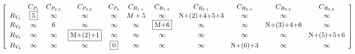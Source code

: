 \begin{figure*}
 \begin{equation*}
\left[ {\begin{array}{*{20}{c}}
&C_{P_{1}}&C_{P_{2.2}}&C_{P_{2.3}}&C_{P_4}&C_{B_{1.1}}&C_{B_{1.2}}&C_{B_{2.1}}&C_{B_{2.4}}&C_{B_{3.2}}&C_{B_{3.3}}\\
R_{V_1}&\fbox{5}&\infty&\infty&\infty&M+5&\infty&${N+(2)+4+5+3}$&\infty&\infty&\infty\\
R_{V_2}&\infty&\mbox{6}&\infty&\infty&\infty&\fbox{M+6}&\infty&\infty&${N+(3)+4+6}$&\infty\\
R_{V_3}&\infty&\infty&\fbox{M+(2)+1}&\infty&\infty&\infty&\infty&\infty&\infty&${N+(5)+5+6}$\\
R_{V_4}&\infty&\infty&\infty&\fbox{0}&\infty&\infty&\infty&${N+(6)+3}$&\infty&\infty\\
\end{array}} \right]
\end{equation*}
\end{figure*}






